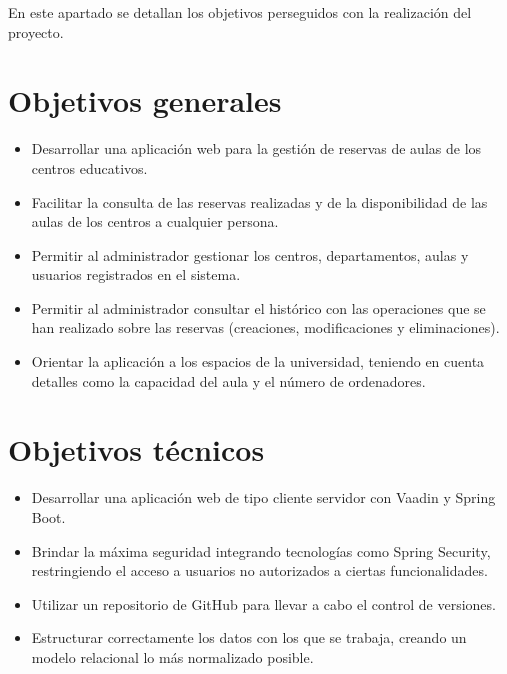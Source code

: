 En este apartado se detallan los objetivos perseguidos con la realización del proyecto.


\section{Objetivos generales}
\begin{itemize}
    \item Desarrollar una aplicación web para la gestión de reservas de aulas de los centros educativos.
    \item Facilitar la consulta de las reservas realizadas y de la disponibilidad de las aulas de los centros a cualquier persona.
    \item Permitir al administrador gestionar los centros, departamentos, aulas y usuarios registrados en el sistema.
    \item Permitir al administrador consultar el histórico con las operaciones que se han realizado sobre las reservas (creaciones, modificaciones y eliminaciones).
    \item Orientar la aplicación a los espacios de la universidad, teniendo en cuenta detalles como la capacidad del aula y el número de ordenadores.
\end{itemize}

\section{Objetivos técnicos}
\begin{itemize}
    \item Desarrollar una aplicación web de tipo cliente servidor con Vaadin y Spring Boot.
    \item Brindar la máxima seguridad integrando tecnologías como Spring Security, restringiendo el acceso a usuarios no autorizados a ciertas funcionalidades.
    \item Utilizar un repositorio de GitHub para llevar a cabo el control de versiones.
    \item Estructurar correctamente los datos con los que se trabaja, creando un modelo relacional lo más normalizado posible.
\end{itemize}